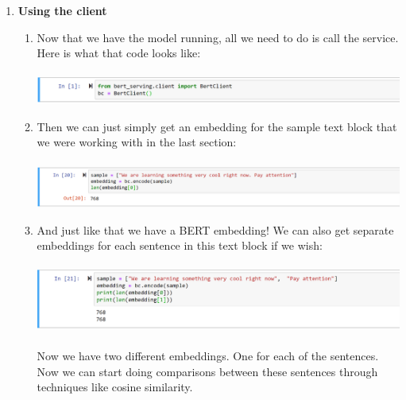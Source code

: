 \documentclass{article}
\begin{document}
\begin{enumerate}
    \item \textbf{Using the client}
    \begin{enumerate}
    \item[] Now that we have the model running, all we need to do is call the service.  Here is what that code looks like:\\
    \vspace{.1cm}\\
    \includegraphics[scale = .7]{service_start.png}
    \vspace{.2cm}\\
    
    \item[] Then we can just simply get an embedding for the sample text block that we were working with in the last section:\\
    \vspace{.1cm}\\
    \includegraphics[scale = .625]{service_sample.png}
    
    \item[] And just like that we have a BERT embedding! We can also get separate embeddings for each sentence in this text block if we wish:\\
    \vspace{.1cm}\\
    \includegraphics[scale = .7]{sample_list.png}\\
    \vspace{.1cm}\\
    Now we have two different embeddings. One for each of the sentences. Now we can start doing comparisons between these sentences through techniques like cosine similarity.
    \end{enumerate}
    
    
\end{enumerate}
\end{document}
